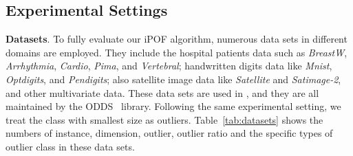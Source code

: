 \documentclass[sigconf,nonacm]{acmart}
\begin{document}
\subsection{Experimental Settings}
\textbf{Datasets}. To fully evaluate our iPOF algorithm, numerous data sets in different domains are employed. They include the hospital patients data such as \textit{BreastW}, \textit{Arrhythmia}, \textit{Cardio}, \textit{Pima}, and \textit{Vertebral}; handwritten digits data like \textit{Mnist}, \textit{Optdigits}, and \textit{Pendigits}; also satellite image data like \textit{Satellite} and \textit{Satimage-2}, and other multivariate data. These data sets are used in \textcolor{gray}{\cite{Aggarwal2015TheoreticalFA,Keller2012HiCSHC,LiuFei2008,bandaragoda2014efficient,SatheA16,micenkova2014learning}}, and they are all maintained by the ODDS~\textcolor{gray}{\cite{Rayana:2016}} library. Following the same experimental setting, we treat the class with smallest size as outliers. Table\textcolor{red}{~\ref{tab:datasets}} shows the numbers of instance, dimension, outlier, outlier ratio and the specific types of outlier class in these data sets.
\end{document}
